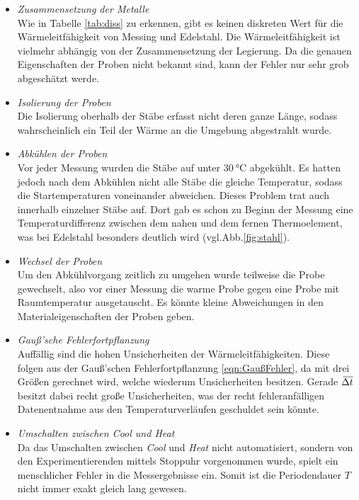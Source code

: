 \begin{itemize}
    \item \textit{Zusammensetzung der Metalle}\\
    Wie in Tabelle \ref{tab:diss} zu erkennen, gibt es keinen diskreten Wert für die Wärmeleitfähigkeit von Messing und Edelstahl. Die
    Wärmeleitfähigkeit ist vielmehr abhängig von der Zusammensetzung der Legierung. Da die genauen Eigenschaften der Proben nicht bekannt
    sind, kann der Fehler nur sehr grob abgeschätzt werde.
    \item \textit{Isolierung der Proben}\\
    Die Isolierung oberhalb der Stäbe erfasst nicht deren ganze Länge, sodass wahrscheinlich ein Teil der Wärme an die Umgebung abgestrahlt wurde.
    \item \textit{Abkühlen der Proben}\\
    Vor jeder Messung wurden die Stäbe auf unter $\SI{30}{\celsius}$ abgekühlt. Es hatten jedoch nach dem Abkühlen nicht alle Stäbe die gleiche
    Temperatur, sodass die Startemperaturen voneinander abweichen. Dieses Problem trat auch innerhalb einzelner Stäbe auf. Dort gab es schon
    zu Beginn der Messung eine Temperaturdifferenz zwischen dem nahen und dem fernen Thermoelement, was bei Edelstahl besonders deutlich wird
    (vgl.Abb.\ref{fig:stahl}).
    \item \textit{Wechsel der Proben}\\
    Um den Abkühlvorgang zeitlich zu umgehen wurde teilweise die Probe gewechselt, also vor einer Messung die warme Probe gegen eine Probe
    mit Raumtemperatur ausgetauscht. Es könnte kleine Abweichungen in den Materialeigenschaften der Proben geben.
    \item \textit{Gauß'sche Fehlerfortpflanzung}\\
    Auffällig sind die hohen Unsicherheiten der Wärmeleitfähigkeiten. Diese folgen aus der Gauß'schen Fehlerfortpflanzung \eqref{eqn:GaußFehler},
    da mit drei Größen gerechnet wird, welche wiederum Unsicherheiten besitzen. Gerade $\,\overline{\!{\Delta t}}$ besitzt dabei recht große Unsicherheiten,
    was der recht fehleranfälligen Datenentnahme aus den Temperaturverläufen geschuldet sein könnte.
    \item \textit{Umschalten zwischen Cool und Heat}\\
    Da das Umschalten zwischen \textit{Cool} und \textit{Heat} nicht automatisiert, sondern von den Experimentierenden mittels Stoppuhr vorgenommen wurde,
    spielt ein menschlicher Fehler in die Messergebnisse ein. Somit ist die Periodendauer $T$ nicht immer exakt gleich lang gewesen.
\end{itemize}
